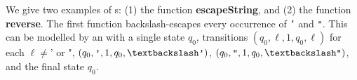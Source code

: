 \begin{example}\label{exmp-ft}
    We give two examples of \FFT{}s: %
    (1) the function \textbf{escapeString}, and (2) the  function \textbf{reverse}.
%
%
%
The first function backslash-escapes every occurrence of \texttt{'} and 
\texttt{"}. This can be modelled by an \FT{} with a single state $q_0$,
transitions 
$(q_0, \ell, 1, q_0, \ell)$ for each $\ell \neq  \texttt{'}$  or $\texttt{"} $, 
$(q_0,\texttt{'}, 1, q_0, \textbackslash\texttt{'})$, 
$(q_0,\texttt{"}, 1, q_0, \textbackslash\texttt{"})$,  
and the final state $q_0$.

\end{example}
